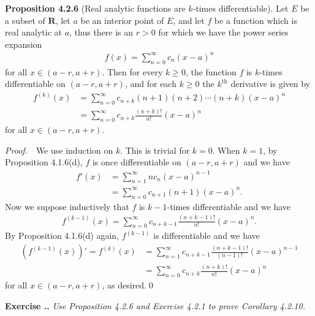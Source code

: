 \documentclass{book}
\newcommand{\pff}{\vspace{.25em}\noindent\emph{Proof.}~~}
\newcommand{\titl}[1]{\noindent\textbf{#1}}
\newcounter{Exercise}[section]
\renewcommand{\theExercise}{\thesection.\arabic{Exercise}.}
\newcommand{\new}{\vspace{1.5em}\noindent\textbf{Exercise \stepcounter{Exercise}\textbf{\theExercise}} }
\begin{document}
\begin{framed}
\titl{Proposition 4.2.6} (Real analytic functions are $k$-times differentiable). Let $E$ be a subset of $\mathbf{R}$, let $a$ be an interior point of $E$, and let $f$ be a function which is real analytic at $a$, thus there is an $r > 0$ for which we have the power series expansion
    \begin{align*}
        f(x) = \sum_{n = 0}^{\infty} c_n(x - a)^n
    \end{align*}
for all $x \in (a - r, a + r)$. Then for every $k \geq 0$, the function $f$ is $k$-times differentiable on $(a - r, a + r)$, and for each $k \geq 0$ the $k^{\text{th}}$ derivative is given by
    \begin{align*}
        f^{(k)}(x)
        &= \sum_{n = 0}^{\infty} c_{n + k}(n + 1)(n + 2) \cdots (n + k)(x - a)^{n}\\
        &= \sum_{n = 0}^{\infty} c_{n + k}\frac{(n + k)!}{n!}(x - a)^n
    \end{align*}
for all $x \in (a - r, a + r)$.
\end{framed}

\pff We use induction on $k$. This is trivial for $k = 0$. When $k = 1$, by Proposition 4.1.6(d), $f$ is once differentiable on $(a - r, a + r)$ and we have
    \begin{align*}
        f'(x) &= \sum_{n = 1}^{\infty} nc_n(x - a)^{n - 1}\\
        &= \sum_{n = 0}^{\infty} c_{n + 1}(n + 1)(x - a)^{n}.
    \end{align*}
Now we suppose inductively that $f$ is $k - 1$-times differentiable and we have
    \begin{align*}
        f^{(k - 1)}(x)
        = \sum_{n = 0}^{\infty} c_{n + k - 1}\frac{(n + k - 1)!}{n!}(x - a)^n.
    \end{align*}
By Proposition 4.1.6(d) again, $f^{(k - 1)}$ is differentiable and we have
    \begin{align*}
        \left(f^{(k - 1)}(x)\right)' = f^{(k)}(x)
        &= \sum_{n = 1}^{\infty} c_{n + k - 1}\frac{(n + k - 1)!}{(n - 1)!}(x - a)^{n - 1}\\
        &= \sum_{n = 0}^{\infty} c_{n + k}\frac{(n + k)!}{n!}(x - a)^n
    \end{align*}
for all $x \in (a - r, a + r)$, as desired.\qed

\new\emph{Use Proposition 4.2.6 and Exercise 4.2.1 to prove Corollary 4.2.10.}
\end{document}
